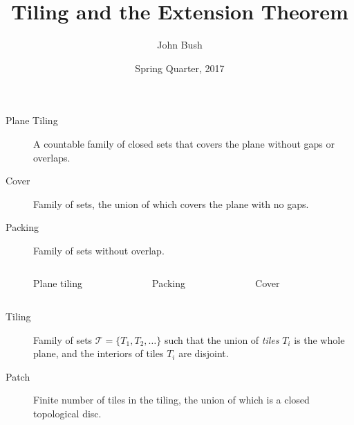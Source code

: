 \documentclass{beamer}
\title{Tiling and the Extension Theorem}
\author{John Bush}
\institute{University of Washington, Bothell}
\date{Spring Quarter, 2017}
\begin{document}
 

\begin{frame} 
\titlepage 
\end{frame} 

\begin{frame} 

\begin{description} 
    \item[Plane Tiling] A countable family of closed sets that covers the plane without gaps or overlaps. 
    \item[Cover] Family of sets, the union of which covers the plane with no gaps. 
    \item[Packing] Family of sets without overlap. 
\end{description} 
\begin{block}{} 
    \begin{columns} 
        \begin{figure} 
        \center
         
        \caption{Plane tiling\footnotemark} 
        \end{figure}
        \begin{figure} 
        \center
         
        \caption{Packing\footnotemark} 
        \end{figure} 
        \begin{figure}
            \center
             
            \caption{Cover} 
        \end{figure} 
    \end{columns} 
\end{block}


\end{frame} 

\begin{frame} 

\begin{description} 
    \item[Tiling] Family of sets $\mathscr{T} = \{ T_1, T_2, \dots \}$ such that the union of \emph{tiles} $T_i$ is the whole plane, and the interiors of tiles $T_i$ are disjoint. 
    \item[Patch] Finite number of tiles in the tiling, the union of which is a closed topological disc. 
\end{description} 

\end{frame} 
\end{document}
